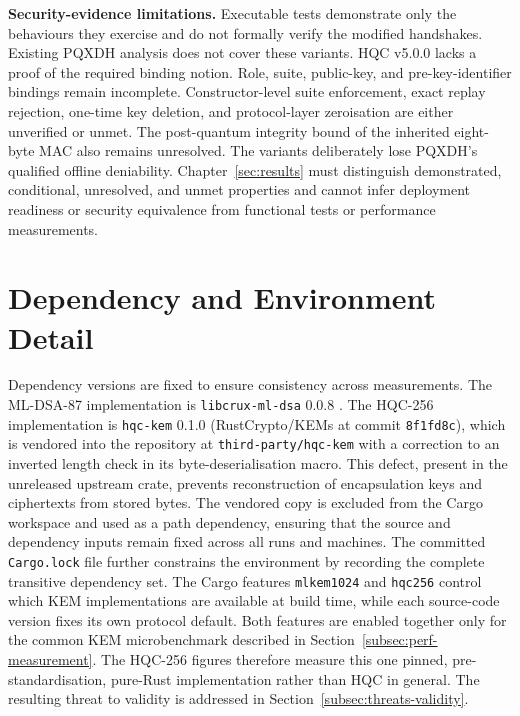 \textbf{Security-evidence limitations.} Executable tests demonstrate only the behaviours they exercise and do not formally verify the modified handshakes. Existing PQXDH analysis does not cover these variants. HQC v5.0.0 lacks a proof of the required binding notion. Role, suite, public-key, and pre-key-identifier bindings remain incomplete. Constructor-level suite enforcement, exact replay rejection, one-time key deletion, and protocol-layer zeroisation are either unverified or unmet. The post-quantum integrity bound of the inherited eight-byte MAC also remains unresolved. The variants deliberately lose PQXDH's qualified offline deniability. Chapter~\ref{sec:results} must distinguish demonstrated, conditional, unresolved, and unmet properties and cannot infer deployment readiness or security equivalence from functional tests or performance measurements.

\section{Dependency and Environment Detail}
\label{app:dependency-detail}

Dependency versions are fixed to ensure consistency across measurements. The ML-DSA-87 implementation is \texttt{libcrux-ml-dsa} 0.0.8 \cite{noauthor_cratesio_2026}. The HQC-256 implementation is \texttt{hqc-kem} 0.1.0 (RustCrypto/KEMs at commit \texttt{8f1fd8c}), which is vendored into the repository at \texttt{third-party/hqc-kem} with a correction to an inverted length check in its byte-deserialisation macro. This defect, present in the unreleased upstream crate, prevents reconstruction of encapsulation keys and ciphertexts from stored bytes. The vendored copy is excluded from the Cargo workspace and used as a path dependency, ensuring that the source and dependency inputs remain fixed across all runs and machines. The committed \texttt{Cargo.lock} file further constrains the environment by recording the complete transitive dependency set. The Cargo features \texttt{mlkem1024} and \texttt{hqc256} control which KEM implementations are available at build time, while each source-code version fixes its own protocol default. Both features are enabled together only for the common KEM microbenchmark described in Section~\ref{subsec:perf-measurement}. The HQC-256 figures therefore measure this one pinned, pre-standardisation, pure-Rust implementation rather than HQC in general. The resulting threat to validity is addressed in Section~\ref{subsec:threats-validity}.